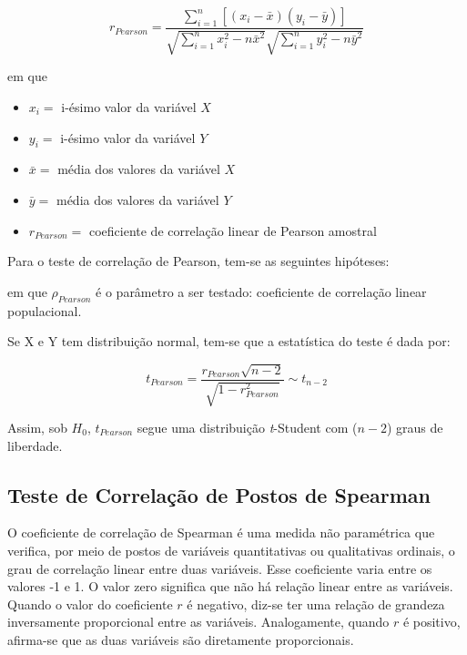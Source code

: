 \documentclass[
  portuguese,
]{estat/estat}
\begin{document}
\[r_{Pearson} = \frac{\displaystyle \sum_{i=1}^{n} \left [ \left(x_i-\bar{x}\right) \left(y_i-\bar{y}\right) \right]}{\sqrt{\displaystyle \sum_{i=1}^{n} x_i^2 - n\bar{x}^2} \sqrt{\displaystyle \sum_{i=1}^{n} y_i^2 - n\bar{y}^2}}\]

\noindent em que

\begin{itemize}
\item
  \(x_i=\) i-ésimo valor da variável \(X\)
\item
  \(y_i=\) i-ésimo valor da variável \(Y\)
\item
  \(\bar{x}=\) média dos valores da variável \(X\)
\item
  \(\bar{y}=\) média dos valores da variável \(Y\)
\item
  \(r_{Pearson}=\) coeficiente de correlação linear de Pearson amostral
\end{itemize}

Para o teste de correlação de Pearson, tem-se as seguintes hipóteses:


em que \(\rho_{Pearson}\) é o parâmetro a ser testado: coeficiente de
correlação linear populacional.

Se X e Y tem distribuição normal, tem-se que a estatística do teste é
dada por:

\[t_{Pearson} = \frac{r_{Pearson} \sqrt{n-2}}{\sqrt{1-r_{Pearson}^2}} \sim t_{n-2} \]

Assim, sob \(H_{0}\), \(t_{Pearson}\) segue uma distribuição
\textit{t}-Student com (\(n - 2\)) graus de liberdade.

\subsection{Teste de Correlação de Postos de
Spearman}\label{teste-de-correlauxe7uxe3o-de-postos-de-spearman}

O coeficiente de correlação de Spearman é uma medida não paramétrica que
verifica, por meio de postos de variáveis quantitativas ou qualitativas
ordinais, o grau de correlação linear entre duas variáveis. Esse
coeficiente varia entre os valores -1 e 1. O valor zero significa que
não há relação linear entre as variáveis. Quando o valor do coeficiente
\(r\) é negativo, diz-se ter uma relação de grandeza inversamente
proporcional entre as variáveis. Analogamente, quando \(r\) é positivo,
afirma-se que as duas variáveis são diretamente proporcionais.
\end{document}
